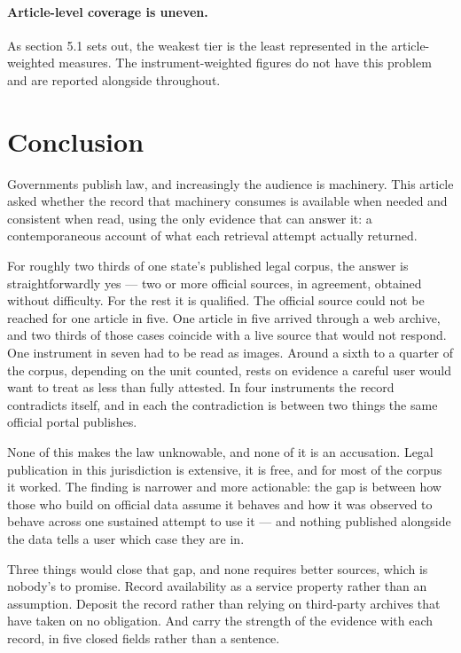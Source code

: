 \documentclass[11pt]{article}
\begin{document}
\paragraph{Article-level coverage is uneven.} As section 5.1 sets out, the
weakest tier is the least represented in the article-weighted measures. The
instrument-weighted figures do not have this problem and are reported alongside
throughout.

\section{Conclusion}

Governments publish law, and increasingly the audience is machinery. This
article asked whether the record that machinery consumes is available when
needed and consistent when read, using the only evidence that can answer it: a
contemporaneous account of what each retrieval attempt actually returned.

For roughly two thirds of one state's published legal corpus, the answer is
straightforwardly yes --- two or more official sources, in agreement, obtained
without difficulty. For the rest it is qualified. The official source could not
be reached for one article in five. One article in five arrived through a web
archive, and two thirds of those cases coincide with a live source that would
not respond. One instrument in seven had to be read as images. Around a sixth
to a quarter of the corpus, depending on the unit counted, rests on evidence a
careful user would want to treat as less than fully attested. In four
instruments the record contradicts itself, and in each the contradiction is
between two things the same official portal publishes.

None of this makes the law unknowable, and none of it is an accusation. Legal
publication in this jurisdiction is extensive, it is free, and for most of the
corpus it worked. The finding is narrower and more actionable: the gap is
between how those who build on official data assume it behaves and how it was
observed to behave across one sustained attempt to use it --- and nothing
published alongside the data tells a user which case they are in.

Three things would close that gap, and none requires better sources, which is
nobody's to promise. Record availability as a service property rather than an
assumption. Deposit the record rather than relying on third-party archives that
have taken on no obligation. And carry the strength of the evidence with each
record, in five closed fields rather than a sentence.
\end{document}
